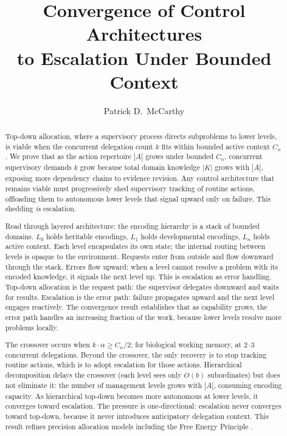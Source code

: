 \documentclass[11pt]{article}
\title{Convergence of Control Architectures\\to Escalation Under Bounded Context}
\author{Patrick D.\ McCarthy}
\date{}
\theoremstyle{definition}
\begin{document}
\maketitle

\begin{abstract}
Top-down allocation, where a supervisory process directs subproblems
to lower levels, is viable when the concurrent delegation count $k$
fits within bounded active context $C_n$. We prove that as the action repertoire $|A|$ grows under bounded
$C_n$, concurrent supervisory demands $k$ grow because total domain
knowledge $|K|$ grows with $|A|$, exposing more dependency chains to
evidence revision. Any control architecture that remains viable must
progressively shed supervisory tracking of routine actions, offloading
them to autonomous lower levels that signal upward only on failure. This shedding \emph{is} escalation.

Read through layered architecture: the encoding hierarchy is a stack of
bounded domains. $L_0$ holds heritable encodings, $L_1$
holds developmental encodings, $L_n$ holds active context. Each level
encapsulates its own state; the internal routing between levels is
opaque to the environment. Requests enter from outside and flow
downward through the stack. Errors flow upward: when a level cannot
resolve a problem with its encoded knowledge, it signals the next level
up. This is escalation as error handling. Top-down allocation is the
request path: the supervisor delegates downward and waits for results.
Escalation is the error path: failure propagates upward and the next
level engages reactively. The convergence result establishes that as
capability grows, the error path handles an increasing fraction of
the work, because lower levels resolve more problems locally.

The crossover occurs when $k \cdot \alpha
\geq C_n / 2$; for biological working memory, at 2--3 concurrent
delegations. Beyond the crossover, the only recovery is to stop
tracking routine actions, which is to adopt escalation for those
actions. Hierarchical decomposition delays the crossover (each level
sees only $O(b)$ subordinates) but does not eliminate it: the number
of management levels grows with $|A|$, consuming encoding capacity.
As hierarchical top-down becomes more autonomous at lower levels, it
converges toward escalation. The pressure is one-directional:
escalation never converges toward top-down, because it never
introduces anticipatory delegation context. This result refines
precision allocation models including the Free Energy Principle
\cite{Friston2010,Friston2017}.
\end{abstract}
\end{document}
